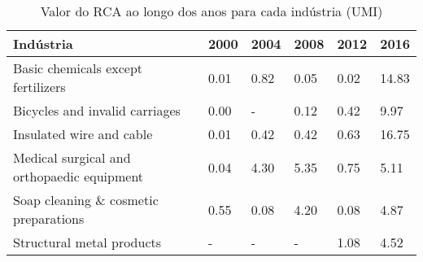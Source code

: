 \begin{table}
\centering
\caption{Valor do RCA ao longo dos anos para cada indústria (UMI)}
\label{tab:ex3-tempo-UMI}
\begin{tabular}{p{6cm}p{1.5cm}p{1.5cm}p{1.5cm}p{1.5cm}p{1.5cm}}
\toprule
                                 Indústria & 2000 & 2004 & 2008 & 2012 &  2016 \\
\midrule
        Basic chemicals except fertilizers & 0.01 & 0.82 & 0.05 & 0.02 & 14.83 \\
            Bicycles and invalid carriages & 0.00 &    - & 0.12 & 0.42 &  9.97 \\
                  Insulated wire and cable & 0.01 & 0.42 & 0.42 & 0.63 & 16.75 \\
Medical surgical and orthopaedic equipment & 0.04 & 4.30 & 5.35 & 0.75 &  5.11 \\
     Soap cleaning \& cosmetic preparations & 0.55 & 0.08 & 4.20 & 0.08 &  4.87 \\
                 Structural metal products &    - &    - &    - & 1.08 &  4.52 \\
\bottomrule
\end{tabular}
\end{table}
